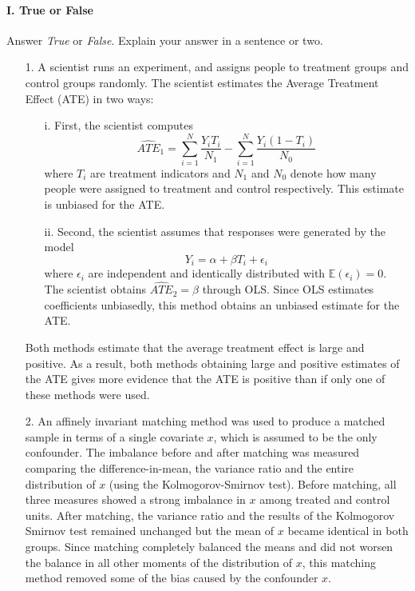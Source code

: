 \documentclass{article}
\newcommand{\E}[0]{\mathbb{E}}
\begin{document}
\paragraph{\Large I. True or False}
Answer {\em True} or {\em False}.  Explain your answer in a sentence or two.
\begin{itemize}
\item[1.]   A scientist runs an experiment, and assigns people to 
      treatment groups and control groups randomly.
      The scientist estimates the Average Treatment Effect (ATE) in two ways: 
      \begin{enumerate}
        \item[i.] First, the scientist computes
          $$
            \widehat{ATE}_1 = \sum_{i=1}^N \frac{Y_iT_i}{N_1} -\sum_{i=1}^N \frac{Y_i(1-T_i)}{N_0} 
          $$
           where $T_i$ are treatment indicators and 
           $N_1$ and $N_0$ denote how many people were assigned to 
           treatment and control respectively.
           This estimate is unbiased for the ATE.
         \item[ii.] Second, the scientist assumes that responses were generated by the model
           $$
             Y_i = \alpha + \beta T_i + \epsilon_i
           $$
           where $\epsilon_i$ are independent
           and identically distributed with $\E(\epsilon_i) = 0$.
           The scientist obtains $\widehat{ATE}_2 = \hat\beta $ through OLS.
           Since OLS estimates coefficients unbiasedly, this 
           method obtains an unbiased estimate for the ATE.
      \end{enumerate}
      Both methods estimate that the average treatment effect is large
      and positive. %
  As a result, both methods obtaining large and positive estimates of the ATE gives 
      more evidence that the ATE is positive than if
      only one of these methods were used.
    \item[2.]  An affinely invariant matching method was used to
      produce a matched sample in terms of a single covariate $x$, which
      is assumed to be the only confounder. The imbalance before and
      after matching was measured comparing the difference-in-mean,
      the variance ratio and the entire distribution of $x$ (using the
      Kolmogorov-Smirnov test). Before matching, all three measures
      showed a strong imbalance in $x$ among treated and control
      units. After matching, the variance ratio and the results of the
      Kolmogorov Smirnov test remained unchanged but the mean of $x$
      became identical in both groups. Since matching completely
      balanced the means and did not worsen the balance in all other
      moments of the distribution of $x$, this matching method removed
      some of the bias caused by the confounder $x$.


\end{itemize}
\end{document}
